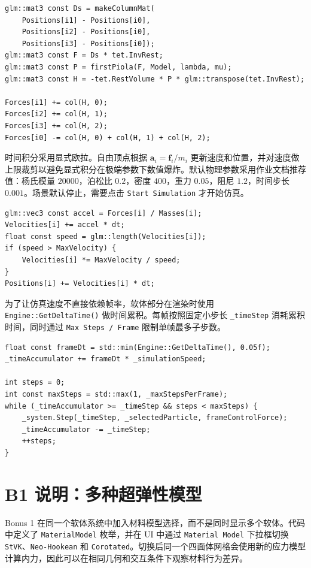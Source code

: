 \documentclass[UTF8,a4paper,11pt,fontset=fandol]{ctexart}
\begin{document}
\begin{lstlisting}[style=cppstyle,caption={由 deformation gradient 计算四面体内力}]
glm::mat3 const Ds = makeColumnMat(
    Positions[i1] - Positions[i0],
    Positions[i2] - Positions[i0],
    Positions[i3] - Positions[i0]);
glm::mat3 const F = Ds * tet.InvRest;
glm::mat3 const P = firstPiola(F, Model, lambda, mu);
glm::mat3 const H = -tet.RestVolume * P * glm::transpose(tet.InvRest);

Forces[i1] += col(H, 0);
Forces[i2] += col(H, 1);
Forces[i3] += col(H, 2);
Forces[i0] -= col(H, 0) + col(H, 1) + col(H, 2);
\end{lstlisting}

时间积分采用显式欧拉。自由顶点根据 $\mathbf{a}_i=\mathbf{f}_i/m_i$ 更新速度和位置，并对速度做上限裁剪以避免显式积分在极端参数下数值爆炸。默认物理参数采用作业文档推荐值：杨氏模量 $20000$，泊松比 $0.2$，密度 $400$，重力 $0.05$，阻尼 $1.2$，时间步长 $0.001$。场景默认停止，需要点击 \texttt{Start Simulation} 才开始仿真。

\begin{lstlisting}[style=cppstyle,caption={显式欧拉积分与速度上限}]
glm::vec3 const accel = Forces[i] / Masses[i];
Velocities[i] += accel * dt;
float const speed = glm::length(Velocities[i]);
if (speed > MaxVelocity) {
    Velocities[i] *= MaxVelocity / speed;
}
Positions[i] += Velocities[i] * dt;
\end{lstlisting}

为了让仿真速度不直接依赖帧率，软体部分在渲染时使用 \texttt{Engine::GetDeltaTime()} 做时间累积。每帧按照固定小步长 \texttt{\_timeStep} 消耗累积时间，同时通过 \texttt{Max Steps / Frame} 限制单帧最多子步数。

\begin{lstlisting}[style=cppstyle,caption={软体模拟的固定时间步推进}]
float const frameDt = std::min(Engine::GetDeltaTime(), 0.05f);
_timeAccumulator += frameDt * _simulationSpeed;

int steps = 0;
int const maxSteps = std::max(1, _maxStepsPerFrame);
while (_timeAccumulator >= _timeStep && steps < maxSteps) {
    _system.Step(_timeStep, _selectedParticle, frameControlForce);
    _timeAccumulator -= _timeStep;
    ++steps;
}
\end{lstlisting}

\section{B1 说明：多种超弹性模型}

Bonus 1 在同一个软体系统中加入材料模型选择，而不是同时显示多个软体。代码中定义了
\texttt{MaterialModel} 枚举，并在 UI 中通过 \texttt{Material Model} 下拉框切换
\texttt{StVK}、\texttt{Neo-Hookean} 和 \texttt{Corotated}。切换后同一个四面体网格会使用新的应力模型计算内力，因此可以在相同几何和交互条件下观察材料行为差异。
\end{document}
